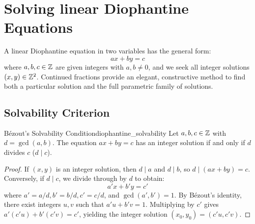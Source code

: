 \documentclass[a4paper]{article}
\begin{document}
\section{Solving linear Diophantine Equations}\label{cf:sec:solving-linear-diophantine-equations}
A linear Diophantine equation in two variables has the general form:
\begin{equation}\label{cf:eq:linear-diophantine}
  a x + b y = c
\end{equation}
where $a, b, c \in \mathbb{Z}$ are given integers with $a, b \ne 0$, and we seek all integer solutions $(x, y) \in \mathbb{Z}^2$.
Continued fractions provide an elegant, constructive method to find both a particular solution and the full parametric family of solutions.

\subsection{Solvability Criterion}
\begin{mylemma}{B\'ezout's Solvability Condition}{diophantine_solvability}
  Let $a, b, c \in \mathbb{Z}$ with $d = \gcd(a, b)$.
  The equation $a x + b y = c$ has an integer solution if and only if $d$ divides $c$ ($d \mid c$).

  \begin{proof}
    If $(x, y)$ is an integer solution, then $d \mid a$ and $d \mid b$, so $d \mid (ax + by) = c$.
    Conversely, if $d \mid c$, we divide through by $d$ to obtain:
    \[
      a' x + b' y = c'
    \]
    where $a' = a/d, b' = b/d, c' = c/d$, and $\gcd(a', b') = 1$.
    By B\'ezout's identity, there exist integers $u, v$ such that $a' u + b' v = 1$.
    Multiplying by $c'$ gives $a'(c' u) + b'(c' v) = c'$, yielding the integer solution $(x_0, y_0) = (c' u, c' v)$.
  \end{proof}
\end{mylemma}
\end{document}
